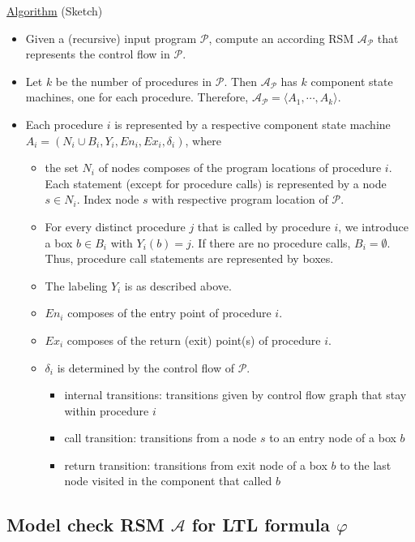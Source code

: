 \documentclass[a4paper,12pt]{article}
\begin{document}
\underline{Algorithm} (Sketch)
\begin{itemize}
	\item Given a (recursive) input program $\mathcal{P}$, compute an according RSM $\mathcal{A}_{\mathcal{P}}$ that represents the control flow in $\mathcal{P}$.
	\item Let $k$ be the number of procedures in $\mathcal{P}$. Then $\mathcal{A}_{\mathcal{P}}$ has $k$ component state machines, one for each procedure. Therefore, $\mathcal{A}_{\mathcal{P}}=\langle A_1, \cdots, A_k \rangle$.
	\item Each procedure $i$ is represented by a respective component state machine $A_i=(N_i \cup B_i, Y_i, En_i, Ex_i, \delta_i)$, where
	\begin{itemize}
		\item the set $N_i$ of nodes composes of the program locations of procedure $i$. Each statement (except for procedure calls) is represented by a node $s \in N_i$. Index node $s$ with respective program location of $\mathcal{P}$.
		\item For every distinct procedure $j$ that is called by procedure $i$, we introduce a box $b \in B_i$ with $Y_i(b)=j$. If there are no procedure calls, $B_i=\emptyset$. Thus, procedure call statements are represented by boxes.
		\item The labeling $Y_i$ is as described above.
		\item $En_i$ composes of the entry point of procedure $i$.
		\item $Ex_i$ composes of the return (exit) point(s) of procedure $i$.
		\item $\delta_i$ is determined by the control flow of $\mathcal{P}$.
		\begin{itemize}
			\item internal transitions: transitions given by control flow graph that stay within procedure $i$
			\item call transition: transitions from a node $s$ to an entry node of a box $b$
			\item return transition: transitions from exit node of a box $b$ to the last node visited in the component that called $b$
		\end{itemize}
	\end{itemize}
\end{itemize}

\subsection{Model check RSM $\mathcal{A}$ for LTL formula $\varphi$}
\end{document}
